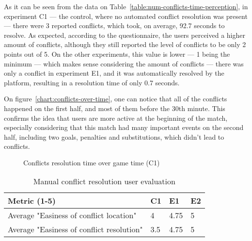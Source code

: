 As it can be seen from the data on Table~\ref{table:num-conflicts-time-perception}, in experiment C1 --- the control, where no automated conflict resolution was present --- there were 3 reported conflicts, which took, on average, 92.7 seconds to resolve. As expected, according to the questionnaire, the users perceived a higher amount of conflicts, although they still reported the level of conflicts to be only 2 points out of 5. On the other experiments, this value is lower --- 1 being the minimum --- which makes sense considering the amount of conflicts --- there was only a conflict in experiment E1, and it was automatically resolved by the platform, resulting in a resolution time of only 0.7 seconds.

On figure~\ref{chart:conflicts-over-time}, one can notice that all of the conflicts happened on the first half, and most of them before the 30th minute. This confirms the idea that users are more active at the beginning of the match, especially considering that this match had many important events on the second half, including two goals, penalties and substitutions, which didn't lead to conflicts.

\begin{figure}[h]
    \centering
    \caption{Conflicts resolution time over game time (C1)}
    \label{chart:conflicts-res-time-over-time}
\end{figure}

\begin{table}[h]
    \centering
    \caption{Manual conflict resolution user evaluation}
    \begin{tabular}{|l|l|l|l|}
        \hline
        \textbf{Metric (1-5)}                        & \textbf{C1} & \textbf{E1} & \textbf{E2} \\ \hline
        Average "Easiness of conflict location"   & 4  & 4.75  & 5  \\ \hline
        Average "Easiness of conflict resolution"   & 3.5  & 4.75  & 5  \\ \hline
    \end{tabular}
    \label{table:conflicts-resolution-user-perception}
\end{table}

